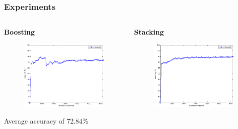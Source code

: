 \documentclass[xcolor=table]{beamer}
\begin{document}
    \begin{frame}
        \frametitle{Experiments}
        \begin{columns}
            \begin{column}{0.5\textwidth}
                \begin{center}
                    \textbf{Boosting}
                \end{center}
                \begin{figure}
                    \centering
                    \includegraphics[width=\textwidth]{figures/boosting_accuracy.eps}
                \end{figure}
                \begin{center}
                    Average accuracy of 72.84\%
                \end{center}
            \end{column}
            \begin{column}{0.5\textwidth}
                \begin{center}
                    \textbf{Stacking}
                \end{center}
                \begin{figure}
                    \centering
                    \includegraphics[width=\textwidth]{figures/stacking_accuracy.eps}

\end{figure}
\end{column}
\end{columns}
\end{frame}
\end{document}
